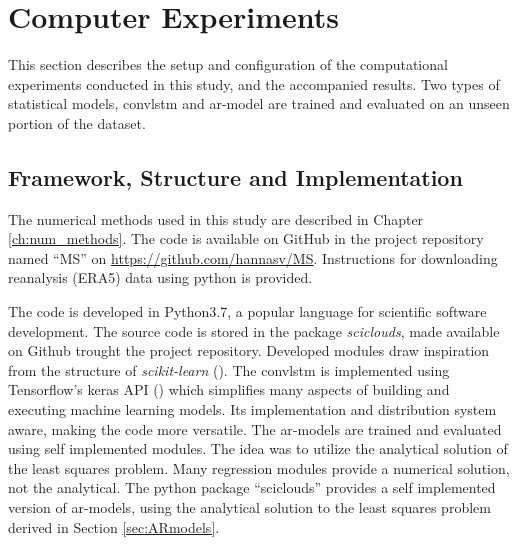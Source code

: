 \section{Computer Experiments} \label{ch:computer_experiments}
This section describes the setup and configuration of the computational experiments conducted in this study, and the accompanied results. Two types of statistical models, \acrshort{convlstm} and \acrshort{ar}-model are trained and evaluated on an unseen portion of the dataset. 

\subsection{Framework, Structure and Implementation} \label{sec:structure_and_implementations} \label{sec:framework}
The numerical methods used in this study are described in Chapter \ref{ch:num_methods}. The code is available on GitHub in the project repository named ``MS'' on \href{https://github.com/hannasv/MS}{https://github.com/hannasv/MS}. Instructions for downloading reanalysis (ERA5) data using python is provided.


The code is developed in Python3.7, a popular language for scientific software development. The source code is stored in the package \textit{sciclouds}, made available on Github trought the project repository. Developed modules draw inspiration from the structure of \textit{scikit-learn} (\cite{sklearn_api}).%
The \acrshort{convlstm} is implemented using Tensorflow's keras API (\cite{tensorflow2015}) which simplifies many aspects of building and executing machine learning models. Its implementation and distribution system aware, making the code more versatile. %
The \acrshort{ar}-models are trained and evaluated using self implemented modules. The idea was to utilize the analytical solution of the least squares problem. Many regression modules provide a numerical solution, not the analytical. The python package ``sciclouds'' provides a self implemented version of \acrshort{ar}-models, using the analytical solution to the least squares problem derived in Section \ref{sec:ARmodels}.

